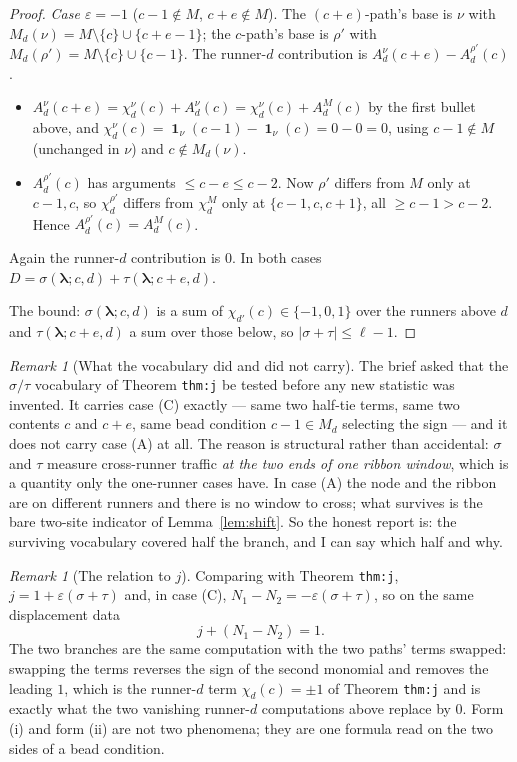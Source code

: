 \documentclass[11pt]{article}
\theoremstyle{definition}
\theoremstyle{remark}
\newtheorem{remark}[theorem]{Remark}
\newcommand{\bl}{\boldsymbol{\lambda}}
\DeclareMathOperator{\Ind}{\mathbf 1}
\begin{document}
\begin{proof}
\emph{Case $\varepsilon=-1$} ($c-1\notin M$, $c+e\notin M$). The $(c+e)$-path's base is
$\nu$ with $M_d(\nu)=M\setminus\{c\}\cup\{c+e-1\}$; the $c$-path's base is $\rho'$ with
$M_d(\rho')=M\setminus\{c\}\cup\{c-1\}$. The runner-$d$ contribution is
$A^{\nu}_d(c+e)-A^{\rho'}_d(c)$.
\begin{itemize}
\item $A^{\nu}_d(c+e)=\chi^{\nu}_d(c)+A^{\nu}_d(c)=\chi^{\nu}_d(c)+A^{M}_d(c)$ by the
first bullet above, and
$\chi^{\nu}_d(c)=\Ind_\nu(c-1)-\Ind_\nu(c)=0-0=0$, using $c-1\notin M$ (unchanged in
$\nu$) and $c\notin M_d(\nu)$.
\item $A^{\rho'}_d(c)$ has arguments $\le c-e\le c-2$. Now $\rho'$ differs from $M$ only
at $c-1,c$, so $\chi^{\rho'}_d$ differs from $\chi^M_d$ only at $\{c-1,c,c+1\}$, all
$\ge c-1>c-2$. Hence $A^{\rho'}_d(c)=A^{M}_d(c)$.
\end{itemize}
Again the runner-$d$ contribution is $0$. In both cases
$D=\sigma(\bl;c,d)+\tau(\bl;c+e,d)$.

The bound: $\sigma(\bl;c,d)$ is a sum of $\chi_{d'}(c)\in\{-1,0,1\}$ over the runners
above $d$ and $\tau(\bl;c+e,d)$ a sum over those below, so $|\sigma+\tau|\le\ell-1$.
\end{proof}

\begin{remark}[What the vocabulary did and did not carry]
The brief asked that the $\sigma/\tau$ vocabulary of Theorem \texttt{thm:j} be tested
before any new statistic was invented. It carries case (C) exactly --- same two half-tie
terms, same two contents $c$ and $c+e$, same bead condition $c-1\in M_d$ selecting the
sign --- and it does not carry case (A) at all. The reason is structural rather than
accidental: $\sigma$ and $\tau$ measure cross-runner traffic \emph{at the two ends of one
ribbon window}, which is a quantity only the one-runner cases have. In case (A) the node
and the ribbon are on different runners and there is no window to cross; what survives is
the bare two-site indicator of Lemma~\ref{lem:shift}. So the honest report is: the
surviving vocabulary covered half the branch, and I can say which half and why.
\end{remark}

\begin{remark}[The relation to $j$]
Comparing with Theorem \texttt{thm:j}, $j=1+\varepsilon(\sigma+\tau)$ and, in case (C),
$N_1-N_2=-\varepsilon(\sigma+\tau)$, so on the same displacement data
\[
j+(N_1-N_2)=1 .
\]
The two branches are the same computation with the two paths' terms swapped: swapping the
terms reverses the sign of the second monomial and removes the leading $1$, which is the
runner-$d$ term $\chi_d(c)=\pm1$ of Theorem \texttt{thm:j} and is exactly what the two
vanishing runner-$d$ computations above replace by $0$. Form (i) and form (ii) are not
two phenomena; they are one formula read on the two sides of a bead condition.
\end{remark}
\end{document}
